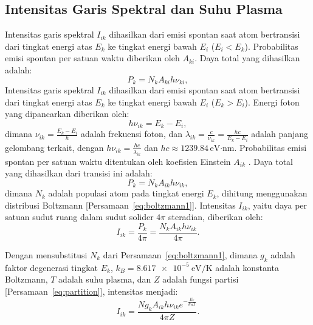 \subsection{Intensitas Garis Spektral dan Suhu Plasma}
Intensitas garis spektral \( I_{ik} \) dihasilkan dari emisi spontan saat atom bertransisi dari tingkat energi atas \( E_k \) ke tingkat energi bawah \( E_i \) (\( E_i < E_k \)). Probabilitas emisi spontan per satuan waktu diberikan oleh \( A_{ki} \). Daya total yang dihasilkan adalah:
\begin{equation}
P_{k} = N_k A_{ki} h \nu_{ki}, \label{eq:power}
\end{equation}
Intensitas garis spektral \( I_{ik} \) dihasilkan dari emisi spontan saat atom bertransisi dari tingkat energi atas \( E_k \) ke tingkat energi bawah \( E_i \) (\( E_k > E_i \)). Energi foton yang dipancarkan diberikan oleh:
\begin{equation}
h \nu_{ik} = E_k - E_i,
\end{equation}
dimana \( \nu_{ik} = \frac{E_k - E_i}{h} \) adalah frekuensi foton, dan \( \lambda_{ik} = \frac{c}{\nu_{ik}} = \frac{h c}{E_k - E_i} \) adalah panjang gelombang terkait, dengan \( h \nu_{ik} = \frac{h c}{\lambda_{ik}} \) dan \( h c \approx 1239.84 \, \text{eV·nm} \). Probabilitas emisi spontan per satuan waktu ditentukan oleh koefisien Einstein \( A_{ik} \) \citep{rybicki-1985}. Daya total yang dihasilkan dari transisi ini adalah:
\begin{equation}
P_k = N_k A_{ik} h \nu_{ik}, \label{eq:power}
\end{equation}
dimana \( N_k \) adalah populasi atom pada tingkat energi \( E_k \), dihitung menggunakan distribusi Boltzmann [Persamaan~\eqref{eq:boltzmann1}]. Intensitas \( I_{ik} \), yaitu daya per satuan sudut ruang dalam sudut solider \( 4\pi \) steradian, diberikan oleh:
\begin{equation}
I_{ik} = \frac{P_k}{4\pi} = \frac{N_k A_{ik} h \nu_{ik}}{4\pi}. \label{eq:intensity}
\end{equation}

Dengan mensubstitusi \( N_k \) dari Persamaan~\eqref{eq:boltzmann1}, dimana \( g_k \) adalah faktor degenerasi tingkat \( E_k \), \( k_B = \SI{8.617e-5}{\electronvolt\per\kelvin} \) adalah konstanta Boltzmann, \( T \) adalah suhu plasma, dan \( Z \) adalah fungsi partisi [Persamaan~\eqref{eq:partition}], intensitas menjadi:
\begin{equation}
I_{ik} = \frac{N g_k A_{ik} h \nu_{ik} e^{-\frac{E_k}{k_B T}}}{4\pi Z}. \label{eq:intensity_full}
\end{equation}


